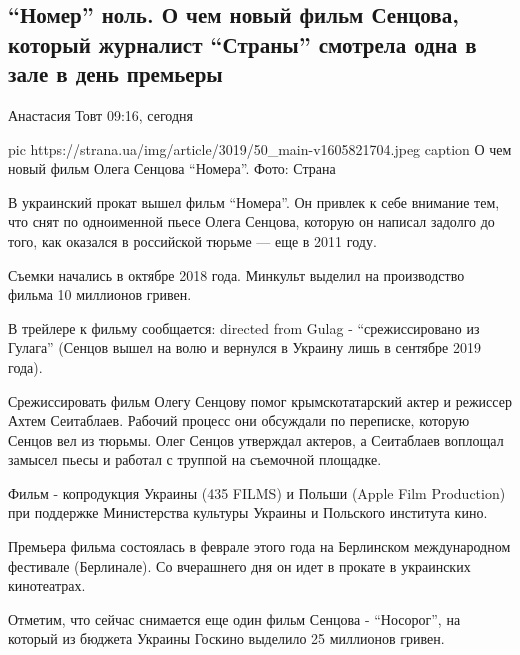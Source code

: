  
 
 

\subsection{\enquote{Номер} ноль. О чем новый фильм Сенцова, который журналист \enquote{Страны} смотрела одна в зале в день премьеры}
\label{sec:20_11_2020.news.ua.strana.1.oleg_sencov_film}

Анастасия Товт 09:16, сегодня

\ifcmt
pic https://strana.ua/img/article/3019/50_main-v1605821704.jpeg
caption О чем новый фильм Олега Сенцова \enquote{Номера}. Фото: Страна
\fi

В украинский прокат вышел фильм \enquote{Номера}. Он привлек к себе внимание тем,
что снят по одноименной пьесе Олега Сенцова, которую он написал задолго до
того, как оказался в российской тюрьме --- еще в 2011 году.

Съемки начались в октябре 2018 года. Минкульт выделил на производство
фильма 10 миллионов гривен.

В трейлере к фильму сообщается: directed from Gulag - \enquote{срежиссировано из
Гулага} (Сенцов вышел на волю и вернулся в Украину лишь в сентябре 2019
года).

Срежиссировать фильм Олегу Сенцову помог крымскотатарский актер и
режиссер Ахтем Сеитаблаев. Рабочий процесс они обсуждали по переписке,
которую Сенцов вел из тюрьмы. Олег Сенцов утверждал актеров, а Сеитаблаев
воплощал замысел пьесы и работал с труппой на съемочной площадке. 

Фильм - копродукция Украины (435 FILMS) и Польши (Apple Film Production)
при поддержке Министерства культуры Украины и Польского института кино.

Премьера фильма состоялась в феврале этого года на Берлинском
международном фестивале (Берлинале). Со вчерашнего дня он идет в прокате в
украинских кинотеатрах.

Отметим, что сейчас снимается еще один фильм Сенцова - \enquote{Носорог}, на
который из бюджета Украины Госкино выделило 25 миллионов гривен.

